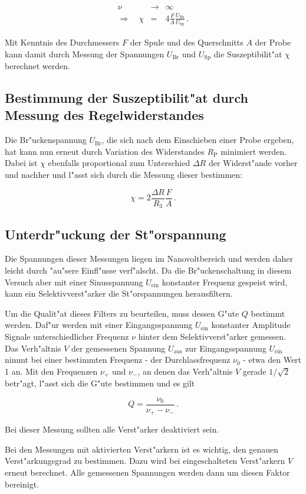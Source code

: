 		\begin{eqnarray}
			\nu & \rightarrow & \infty \nonumber \\
			\Rightarrow \quad \chi & = & 4 \frac{F}{A}\frac{U_\mathrm{Br}}{U_\mathrm{Sp}}\,. \label{chi_u}
		\end{eqnarray}

		Mit Kenntnis des Durchmessers $F$ der Spule und des Querschnitts $A$ der Probe kann damit durch Messung der Spannungen $U_\mathrm{Br}$ und $U_\mathrm{Sp}$ die Suszeptibilit"at $\chi$ berechnet werden.

	
	\subsection{Bestimmung der Suszeptibilit"at durch Messung des Regelwiderstandes}
		\label{subsec:messung_u}
		Die Br"uckenspannung $U_\mathrm{Br}$, die sich nach dem Einschieben einer Probe ergeben, hat kann nun erneut durch Variation des Widerstandes $R_\mathrm{P}$ minimiert werden.
		Dabei ist $\chi$ ebenfalls proportional zum Unterschied $\Delta R$ der Widerst"ande vorher und nachher und l"asst sich durch die Messung dieser bestimmen:

		\begin{equation}
			\label{chi_r}
			\chi = 2 \frac{\Delta R}{R_3}\frac{F}{A}\,.
		\end{equation}

	\subsection{Unterdr"uckung der St"orspannung}
		Die Spannungen dieser Messungen liegen im Nanovoltbereich und werden daher leicht durch "au"sere Einfl"usse verf"alscht.
		Da die Br"uckenschaltung in diesem Versuch aber mit einer Sinusspannung $U_\mathrm{ein}$ konstanter Frequenz gespeist wird, kann ein Selektivverst"arker die St"orspannungen herausfiltern.

		Um die Qualit"at dieses Filters zu beurteilen, muss dessen G"ute $Q$ bestimmt werden.
		Daf"ur werden mit einer Eingangsspannung $U_\mathrm{ein}$ konstanter Amplitude Signale unterschiedlicher Frequenz $\nu$ hinter dem Selektivverst"arker gemessen.
		Das Verh"altnis $V$ der gemessenen Spannung $U_\mathrm{aus}$ zur Eingangsspannung $U_\mathrm{ein}$ nimmt bei einer bestimmten Frequenz - der Durchlassfrequenz $\nu_0$ - etwa den Wert 1 an.
		Mit den Frequenzen $\nu_+$ und $\nu_-$, an denen das Verh"altnis $V$ gerade $1/\sqrt{2}$ betr"agt, l"asst sich die G"ute bestimmen und es gilt

		\begin{equation}
			Q = \frac{\nu_0}{\nu_+ - \nu_-}\,. \label{Gleichung:Guete}
		\end{equation}

		Bei dieser Messung sollten alle Verst"arker deaktiviert sein.

		Bei den Messungen mit aktivierten Verst"arkern ist es wichtig, den genauen Verst"arkungsgrad zu bestimmen.
		Dazu wird bei eingeschalteten Verst"arkern $V$ erneut berechnet.
		Alle gemessenen Spannungen werden dann um diesen Faktor bereinigt.